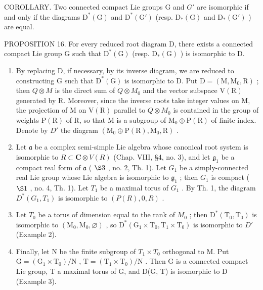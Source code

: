 COROLLARY. Two connected compact Lie groups G and \(G'\) are isomorphic if and only if the diagrams \(\mathrm{D}^{*}(\mathrm{G})\) and \(\mathrm{D}^{*}(\mathrm{G}')\) (resp. \(\mathrm{D}_{*}(\mathrm{G})\) and \(\mathrm{D}_{*}(\mathrm{G}')\) ) are equal.

PROPOSITION 16. For every reduced root diagram D, there exists a connected compact Lie group G such that \(\mathrm{D}^{*}(\mathrm{G})\) (resp. \(\mathrm{D}_{*}(\mathrm{G})\) ) is isomorphic to D.

\begin{enumerate}
\def\labelenumi{\alph{enumi})}
\item
  By replacing D, if necessary, by its inverse diagram, we are reduced to constructing G such that \(\mathrm{D}^{*}(\mathrm{G})\) is isomorphic to D. Put \(\mathrm{D} = (\mathrm{M}, \mathrm{M}_{0}, \mathrm{R})\) ; then \(Q \otimes M\) is the direct sum of \(Q \otimes M_{0}\) and the vector subspace \(\mathrm{V}(\mathrm{R})\) generated by R. Moreover, since the inverse roots take integer values on M, the projection of M on \(\mathrm{V}(\mathrm{R})\) parallel to \(Q \otimes M_{0}\) is contained in the group of weights \(\mathrm{P}(\mathrm{R})\) of R, so that M is a subgroup of \(\mathrm{M}_{0} \oplus \mathrm{P}(\mathrm{R})\) of finite index. Denote by \(D'\) the diagram \((\mathrm{M}_{0} \oplus \mathrm{P}(\mathrm{R}), \mathrm{M}_{0}, \mathrm{R})\) .
\item
  Let \(\mathfrak{a}\) be a complex semi-simple Lie algebra whose canonical root system is isomorphic to \(R \subset \mathbf{C} \otimes V(R)\) (Chap. VIII, §4, no. 3), and let \(\mathfrak{g}_1\) be a compact real form of \(\mathfrak{a}\) ( \(\S 3\) , no. 2, Th. 1). Let \(G_1\) be a simply-connected real Lie group whose Lie algebra is isomorphic to \(\mathfrak{g}_1\) ; then \(G_1\) is compact ( \(\S 1\) , no. 4, Th. 1). Let \(T_1\) be a maximal torus of \(G_1\) . By Th. 1, the diagram \(D^*(G_1, T_1)\) is isomorphic to \((P(R), 0, R)\) .
\item
  Let \(T_{0}\) be a torus of dimension equal to the rank of \(M_{0}\) ; then \(\mathrm{D}^{*}(\mathrm{T}_{0},\mathrm{T}_{0})\) is isomorphic to \((\mathrm{M}_{0},\mathrm{M}_{0},\varnothing)\) , so \(\mathrm{D}^{*}(\mathrm{G}_{1}\times\mathrm{T}_{0},\mathrm{T}_{1}\times\mathrm{T}_{0})\) is isomorphic to \(D'\) (Example 2).
\item
  Finally, let N be the finite subgroup of \(T_{1} \times T_{0}\) orthogonal to M. Put \(\mathrm{G} = (\mathrm{G}_{1} \times \mathrm{T}_{0})/\mathrm{N}\) , \(\mathrm{T} = (\mathrm{T}_{1} \times \mathrm{T}_{0})/\mathrm{N}\) . Then G is a connected compact Lie group, T a maximal torus of G, and D(G, T) is isomorphic to D (Example 3).
\end{enumerate}

